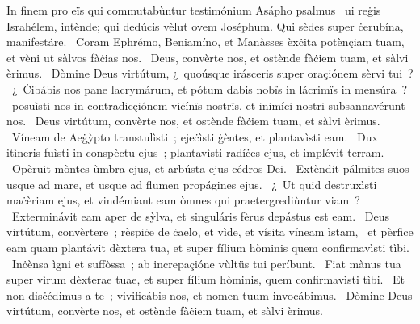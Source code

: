 { In finem pro eïs qui commutabùntur testimónium Asápho psalmus}
{%
~ui reġis Israhélem, intènde; qui dedúcis vèlut ovem Joséphum. Qui sèdes super ċerubína, manifestáre. 
~Coram Ephrémo, Beniamíno, et Manàsses èxċita potènçiam tuam, et vèni ut sàlvos fàċias nos. 
~Deus, convèrte nos, et ostènde fàċiem tuam, et sàlvi èrimus. 
~Dòmine Deus virtútum, ¿~quoúsque irásceris super oraçiónem sèrvi tui~? 
~¿~Ċibábis nos pane lacrymárum, et pótum dabis nobïs in lácrimïs in mensúra~? 
~posuìsti nos in contradicçiónem viċínïs nostrïs, et inimíci nostri subsannavérunt nos. 
~Deus virtútum, convèrte nos, et ostènde fàċiem tuam, et sàlvi èrimus. 
~Víneam de Aeġỳpto transtulìsti~; ejeċìsti ġèntes, et plantavìsti eam. 
~Dux itìneris fuìsti in conspèctu ejus~; plantavìsti radíċes ejus, et implévit terram. 
~Opèruit mòntes ùmbra ejus, et arbústa ejus cédros Dei. 
~Extèndit pálmites suos usque ad mare, et usque ad flumen propágines ejus. 
~¿~Ut quid destruxìsti maċèriam ejus, et vindémiant eam òmnes qui praetergrediùntur viam~? 
~Exterminávit eam aper de sỳlva, et singuláris fèrus depástus est eam. 
~Deus virtútum, convèrtere~; rèspiċe de ċaelo, et vìde, et vísita víneam ìstam, 
~et pèrfice eam quam plantávit dèxtera tua, et super fílium hòminis quem confirmavìsti tìbi. 
~Inċènsa ìgni et suffòssa~; ab increpaçióne vùltüs tui períbunt. 
~Fiat mànus tua super vìrum dèxterae tuae, et super fílium hòminis, quem confirmavìsti tìbi. 
~Et non disċédimus a te~; vivificábis nos, et nomen tuum invocábimus. 
~Dòmine Deus virtútum, convèrte nos, et ostènde fàċiem tuam, et sàlvi èrimus. 
}
